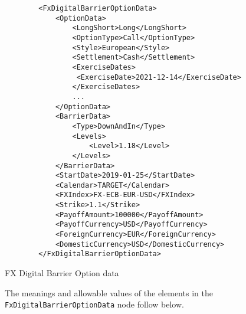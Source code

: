 \begin{listing}[H]
\begin{verbatim}
        <FxDigitalBarrierOptionData>
            <OptionData>
                <LongShort>Long</LongShort>
                <OptionType>Call</OptionType>
                <Style>European</Style>
                <Settlement>Cash</Settlement>                
                <ExerciseDates>
                 <ExerciseDate>2021-12-14</ExerciseDate>
                </ExerciseDates> 
                ...
            </OptionData>
            <BarrierData>
                <Type>DownAndIn</Type>
                <Levels>
                    <Level>1.18</Level>
                </Levels>
            </BarrierData>
            <StartDate>2019-01-25</StartDate>
            <Calendar>TARGET</Calendar>
            <FXIndex>FX-ECB-EUR-USD</FXIndex>
            <Strike>1.1</Strike>
            <PayoffAmount>100000</PayoffAmount>
            <PayoffCurrency>USD</PayoffCurrency>            
            <ForeignCurrency>EUR</ForeignCurrency>
            <DomesticCurrency>USD</DomesticCurrency>
        </FxDigitalBarrierOptionData>
\end{verbatim}
\caption{FX Digital Barrier Option data}
\label{lst:fxdigitalbarrieroption_data}
\end{listing}

The meanings and allowable values of the elements in the \lstinline!FxDigitalBarrierOptionData!  node follow below.

